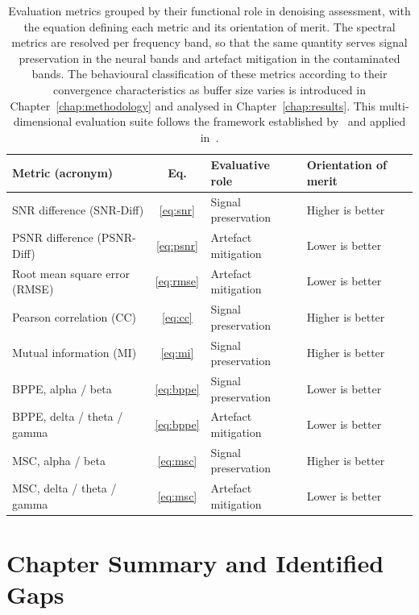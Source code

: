 \documentclass[MScCS,12pt,oneside,final]{uccthesis}
\begin{document}
\begin{table}[!htb]
    \centering
    \renewcommand{\arraystretch}{1.3}
    \begin{tabularx}{\textwidth}{@{} l c >{\raggedright\arraybackslash}X >{\raggedright\arraybackslash}X @{}}
    \toprule
    \textbf{Metric (acronym)} & \textbf{Eq.} & \textbf{Evaluative role} & \textbf{Orientation of merit} \\
    \midrule
    SNR difference (SNR-Diff)      & \ref{eq:snr}  & Signal preservation & Higher is better \\
    PSNR difference (PSNR-Diff)    & \ref{eq:psnr} & Artefact mitigation & Lower is better \\
    Root mean square error (RMSE)  & \ref{eq:rmse} & Artefact mitigation & Lower is better \\
    Pearson correlation (CC)       & \ref{eq:cc}   & Signal preservation & Higher is better \\
    Mutual information (MI)        & \ref{eq:mi}   & Signal preservation & Higher is better \\
    BPPE, alpha / beta             & \ref{eq:bppe} & Signal preservation & Lower is better \\
    BPPE, delta / theta / gamma    & \ref{eq:bppe} & Artefact mitigation & Lower is better \\
    MSC, alpha / beta              & \ref{eq:msc}  & Signal preservation & Higher is better \\
    MSC, delta / theta / gamma     & \ref{eq:msc}  & Artefact mitigation & Lower is better \\
    \bottomrule
    \end{tabularx}
    \caption{Evaluation metrics grouped by their functional role in denoising assessment, with the equation defining each metric and its orientation of merit. The spectral metrics are resolved per frequency band, so that the same quantity serves signal preservation in the neural bands and artefact mitigation in the contaminated bands. The behavioural classification of these metrics according to their convergence characteristics as buffer size varies is introduced in Chapter~\ref{chap:methodology} and analysed in Chapter~\ref{chap:results}. This multi-dimensional evaluation suite follows the framework established by~\parencite{longo2026framework} and applied in~\parencite{longo2025oneegwavelad}.}
    \label{tab:evaluation_metrics}
\end{table}

        
    \section{Chapter Summary and Identified Gaps}
    \label{sec:chapter_summary_gaps}
    
\end{document}
